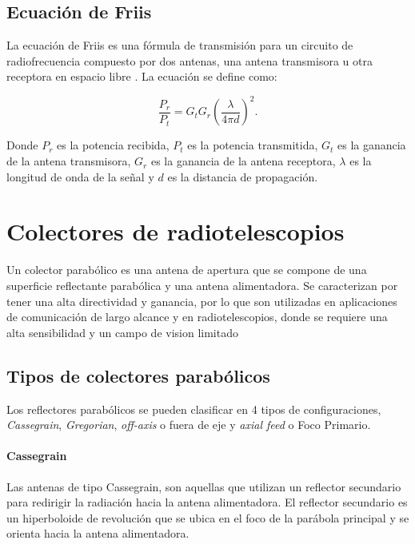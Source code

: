 \subsection{Ecuación de Friis}

La ecuación de Friis es una fórmula de transmisión para un circuito de radiofrecuencia compuesto por dos antenas, una antena transmisora u otra receptora en espacio libre \cite{Friis1946}. La ecuación se define como:

\begin{equation}
    \frac{P_{r}}{P_{t}} = G_{t}G_{r}\left(\frac{\lambda}{4\pi d}\right)^{2}\text{.}
\end{equation}

Donde $P_{r}$ es la potencia recibida, $P_{t}$ es la potencia transmitida, $G_{t}$ es la ganancia de la antena transmisora, $G_{r}$ es la ganancia de la antena receptora, $\lambda$ es la longitud de onda de la señal y $d$ es la distancia de propagación.\\

\section{Colectores de radiotelescopios}

Un colector parabólico es una antena de apertura que se compone de una superficie reflectante parabólica y una antena alimentadora. Se caracterizan por tener una alta directividad y ganancia, por lo que son utilizadas en aplicaciones de comunicación de largo alcance y en radiotelescopios, donde se requiere una alta sensibilidad y un campo de vision limitado\\


\subsection{Tipos de colectores parabólicos}

Los reflectores parabólicos se pueden clasificar en 4 tipos de configuraciones, \textit{Cassegrain}, \textit{Gregorian}, \textit{off-axis} o fuera de eje y \textit{axial feed} o Foco Primario.\\

\paragraph{Cassegrain}

Las antenas de tipo Cassegrain, son aquellas que utilizan un reflector secundario para redirigir la radiación hacia la antena alimentadora. El reflector secundario es un hiperboloide de revolución que se ubica en el foco de la parábola principal y se orienta hacia la antena alimentadora.\\

